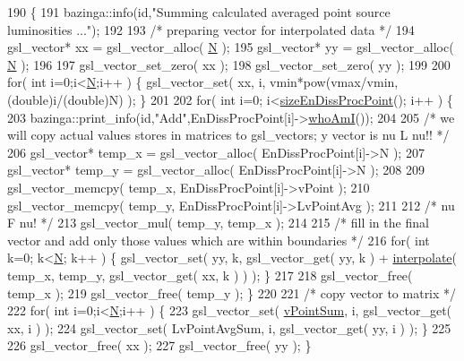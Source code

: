 \begin{DoxyCode}
190 \{
191   bazinga::info(\textcolor{keywordtype}{id},\textcolor{stringliteral}{"Summing calculated averaged point source luminosities ..."});
192 
193   \textcolor{comment}{/* preparing vector for interpolated data */}
194   gsl\_vector* xx = gsl\_vector\_alloc( \hyperlink{classbaseClass_a2b4d07d2b46197d495de0477f4bb22f8}{N} );
195   gsl\_vector* yy = gsl\_vector\_alloc( \hyperlink{classbaseClass_a2b4d07d2b46197d495de0477f4bb22f8}{N} );
196   
197   gsl\_vector\_set\_zero( xx );
198   gsl\_vector\_set\_zero( yy );
199   
200   \textcolor{keywordflow}{for}( \textcolor{keywordtype}{int} i=0;i<\hyperlink{classbaseClass_a2b4d07d2b46197d495de0477f4bb22f8}{N};i++ ) \{ gsl\_vector\_set( xx, i, vmin*pow(vmax/vmin,(\textcolor{keywordtype}{double})i/(\textcolor{keywordtype}{double})N) ); \}
201     
202   \textcolor{keywordflow}{for}( \textcolor{keywordtype}{int} i=0; i<\hyperlink{classobserver_ade865c5881df7e3fc884b50ca812c52e}{sizeEnDissProcPoint}(); i++ ) \{
203     bazinga::print\_info(\textcolor{keywordtype}{id},\textcolor{stringliteral}{"Add"},EnDissProcPoint[i]->\hyperlink{classbaseClass_a756d5accf10ced9a34024048c95a51c9}{whoAmI}());
204     
205     \textcolor{comment}{/* we will copy actual values stores in matrices to gsl\_vectors; y vector is nu L nu!! */}
206     gsl\_vector* temp\_x = gsl\_vector\_alloc( EnDissProcPoint[i]->N );
207     gsl\_vector* temp\_y = gsl\_vector\_alloc( EnDissProcPoint[i]->N );
208       
209     gsl\_vector\_memcpy( temp\_x, EnDissProcPoint[i]->vPoint );
210     gsl\_vector\_memcpy( temp\_y, EnDissProcPoint[i]->LvPointAvg );
211     
212     \textcolor{comment}{/* nu F nu! */}
213     gsl\_vector\_mul( temp\_y, temp\_x );
214     
215     \textcolor{comment}{/* fill in the final vector and add only those values which are within boundaries */}
216     \textcolor{keywordflow}{for}( \textcolor{keywordtype}{int} k=0; k<\hyperlink{classbaseClass_a2b4d07d2b46197d495de0477f4bb22f8}{N}; k++ ) \{ gsl\_vector\_set( yy, k, gsl\_vector\_get( yy, k ) + 
      \hyperlink{classobserver_af7fe35310b73997a7dab21cd6d4141db}{interpolate}( temp\_x, temp\_y, gsl\_vector\_get( xx, k ) ) ); \}
217 
218     gsl\_vector\_free( temp\_x );
219     gsl\_vector\_free( temp\_y ); \}
220   
221   \textcolor{comment}{/* copy vector to matrix */}
222   \textcolor{keywordflow}{for}( \textcolor{keywordtype}{int} i=0;i<\hyperlink{classbaseClass_a2b4d07d2b46197d495de0477f4bb22f8}{N};i++ ) \{
223     gsl\_vector\_set( \hyperlink{classobserver_aef3c4770dc82fdb0d2ac7143e184cbc3}{vPointSum}, i, gsl\_vector\_get( xx, i ) );    
224     gsl\_vector\_set( LvPointAvgSum, i, gsl\_vector\_get( yy, i ) ); \}
225   
226   gsl\_vector\_free( xx );
227   gsl\_vector\_free( yy ); \}
\end{DoxyCode}
